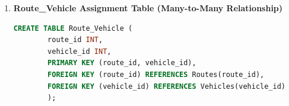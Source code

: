 \documentclass{article}
\begin{document}
\begin{enumerate}
	\item \textbf{Route\_Vehicle Assignment Table (Many-to-Many Relationship)}
	\begin{lstlisting}[language=SQL]
		CREATE TABLE Route_Vehicle (
		route_id INT,               
		vehicle_id INT,             
		PRIMARY KEY (route_id, vehicle_id),
		FOREIGN KEY (route_id) REFERENCES Routes(route_id),
		FOREIGN KEY (vehicle_id) REFERENCES Vehicles(vehicle_id)
		);
	\end{lstlisting}
\end{enumerate}

\end{document}
